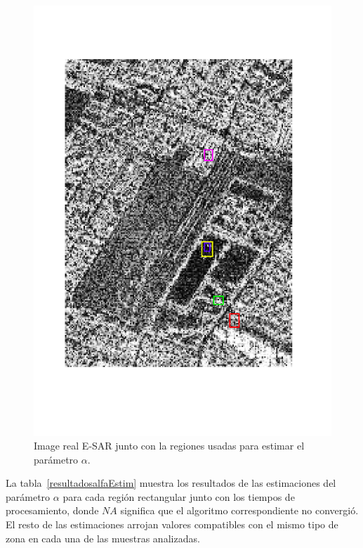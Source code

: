 \begin{figure}[htb]
	\centering
	\includegraphics[width=.52\linewidth,angle=-90]{../../Figures/Tesis/Capitulo6/MunchCortadaReg.pdf}
	\caption{\label{reales2}Image real E-SAR junto con la regiones usadas para estimar el parámetro $\alpha$.}
\end{figure}

La tabla~\ref{resultadosalfaEstim} muestra los resultados de las estimaciones del parámetro $\alpha$ para cada región rectangular junto con los tiempos de procesamiento, donde $NA$ significa que el algoritmo correspondiente no convergió. El resto de las estimaciones arrojan valores compatibles con el mismo tipo de zona en cada una de las muestras analizadas. 

